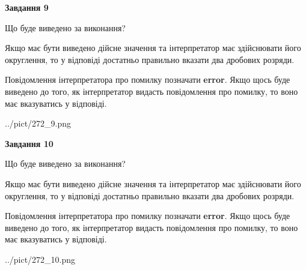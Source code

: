 \documentclass[12pt, ukrainian]{article}
\begin{document}
{\begin {Large}
{\begin {center}\textbf{Завдання 9}\end {center}}\par
Що буде виведено за виконання? \par

Якщо має бути виведено дійсне значення та інтерпретатор має здійснювати його округлення, 
то у відповіді достатньо правильно вказати два дробових розряди.

Повідомлення інтерпретатора про помилку позначати \textbf{error}.
Якщо щось буде виведено до того, як інтерпретатор видасть повідомлення про помилку, 
то воно має вказуватись у відповіді. \par

\begin{center}
	{../pict/272_9.png}
\end{center}
\newpage

{\begin {center}\textbf{Завдання 10}\end {center}}\par
Що буде виведено за виконання? \par

Якщо має бути виведено дійсне значення та інтерпретатор має здійснювати його округлення, 
то у відповіді достатньо правильно вказати два дробових розряди.

Повідомлення інтерпретатора про помилку позначати \textbf{error}.
Якщо щось буде виведено до того, як інтерпретатор видасть повідомлення про помилку, 
то воно має вказуватись у відповіді. \par

\begin{center}
	{../pict/272_10.png}
\end{center}
\newpage

\end {Large}}
\end{document}
